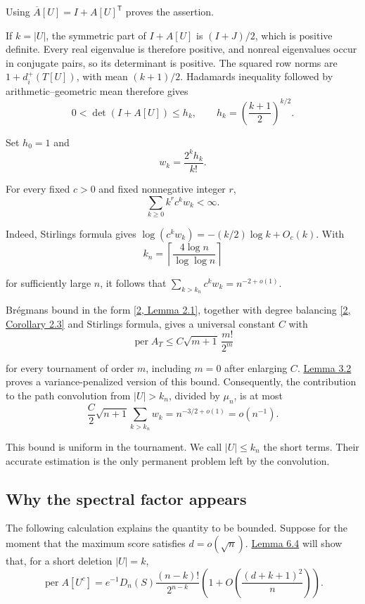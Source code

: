 \documentclass[11pt,a4paper]{article}
\newcommand{\paperref}[2]{\hyperref[#1]{#2}}
\begin{document}
Using \(\overline A[U]=I+A[U]^{\mathsf T}\) proves the assertion.

If \(k=|U|\), the symmetric part of \(I+A[U]\) is \((I+J)/2\), which is positive definite. Every real eigenvalue is therefore positive, and nonreal eigenvalues occur in conjugate pairs, so its determinant is positive. The squared row norms are \(1+d_i^+(T[U])\), with mean \((k+1)/2\). Hadamard\textquotesingle s inequality followed by arithmetic--geometric mean therefore gives
\[0<\det(I+A[U])\le h_k,\qquad h_k=\left(\frac{k+1}{2}\right)^{k/2}.\]

Set \(h_0=1\) and
\[w_k=\frac{2^k h_k}{k!}.\]

For every fixed \(c>0\) and fixed nonnegative integer \(r\),
\[\sum_{k\ge0}k^r c^k w_k<\infty.\]

Indeed, Stirling\textquotesingle s formula gives \(\log(c^kw_k)=-(k/2)\log k+O_c(k)\). With
\[k_n=\left\lceil\frac{4\log n}{\log\log n}\right\rceil\]

for sufficiently large \(n\), it follows that \(\sum_{k>k_n}c^kw_k=n^{-2+o(1)}\).

Brégman\textquotesingle s bound in the form \paperref{bib-2}{[2, Lemma 2.1]}, together with degree balancing \paperref{bib-2}{[2, Corollary 2.3]} and Stirling\textquotesingle s formula, gives a universal constant \(C\) with
\[\operatorname{per}A_T\le C\sqrt{m+1}\,\frac{m!}{2^m}\]

for every tournament of order \(m\), including \(m=0\) after enlarging \(C\). \paperref{thm-3.2}{Lemma 3.2} proves a variance-penalized version of this bound. Consequently, the contribution to the path convolution from \(|U|>k_n\), divided by \(\mu_n\), is at most
\[\frac C2\sqrt{n+1}\sum_{k>k_n}w_k
=n^{-3/2+o(1)}=o(n^{-1}).\]

This bound is uniform in the tournament. We call \(|U|\le k_n\) the short terms. Their accurate estimation is the only permanent problem left by the convolution.

\subsection{Why the spectral factor appears}\label{sec-2.3}

The following calculation explains the quantity to be bounded. Suppose for the moment that the maximum score satisfies \(d=o(\sqrt n)\). \paperref{thm-6.4}{Lemma 6.4} will show that, for a short deletion \(|U|=k\),
\[\operatorname{per}A[U^c]
=e^{-1}D_n(S)\frac{(n-k)!}{2^{n-k}}
\left(1+O\left(\frac{(d+k+1)^2}{n}\right)\right).\]
\end{document}
